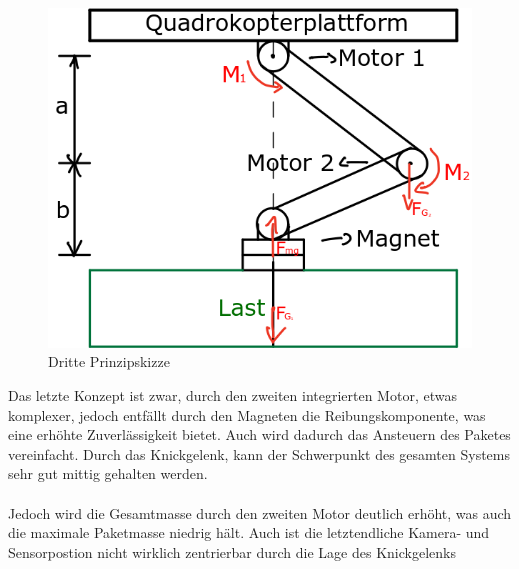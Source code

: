 \begin{figure}[h]
	\begin{center}
	\includegraphics[scale=0.7]{"Grafiken/Skizze3mechanik.png"}
	\caption{Dritte Prinzipskizze}
	\label{dritte_prinzipskizze}
	\end{center}
\end{figure}

Das letzte Konzept ist zwar, durch den zweiten integrierten Motor, etwas komplexer, jedoch entfällt durch den Magneten die Reibungskomponente, was eine erhöhte Zuverlässigkeit bietet. Auch wird dadurch das Ansteuern des Paketes vereinfacht. Durch das Knickgelenk, kann der Schwerpunkt des gesamten Systems sehr gut mittig gehalten werden.\\
\\
Jedoch wird die Gesamtmasse durch den zweiten Motor deutlich erhöht, was auch die maximale Paketmasse niedrig hält. Auch ist die letztendliche Kamera- und Sensorpostion nicht wirklich zentrierbar durch die Lage des Knickgelenks
\newpage
